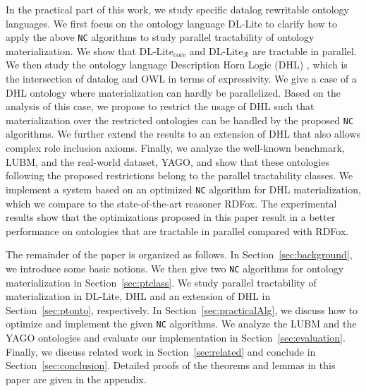In the practical part of this work, we study specific datalog rewritable ontology languages.
We first focus on the ontology language DL-Lite \cite{CalvaneseGLLR07} to clarify how to apply the above \texttt{NC} algorithms
to study parallel tractability of ontology materialization.
We show that DL-Lite$_{\text{core}}$ and DL-Lite$_\mathcal{R}$ are tractable in parallel.
We then study the ontology language Description Horn Logic (DHL) \cite{GrosofHVD03}, which is the intersection of datalog and OWL
in terms of expressivity. We give a case of a DHL ontology where materialization can hardly be parallelized.
Based on the analysis of this case, we propose to restrict the usage of DHL such that materialization over the
restricted ontologies can be handled by the proposed \texttt{NC} algorithms.
We further extend the results to an extension of DHL that also allows complex role inclusion axioms.
Finally, we analyze the well-known benchmark, LUBM, and the real-world dataset, YAGO, and
show that these ontologies following the
proposed restrictions belong to the parallel tractability classes.
We implement a system based on an optimized \texttt{NC} algorithm for DHL materialization,
which we compare to the state-of-the-art reasoner RDFox.
The experimental results show that the optimizations proposed in this paper result in a
better performance on ontologies that are
tractable in parallel compared with RDFox.

The remainder of the paper is organized as follows. In Section~\ref{sec:background}, we introduce some basic notions.
We then give two \texttt{NC} algorithms for ontology materialization in Section~\ref{sec:ptclass}.
We study parallel tractability of materialization in DL-Lite, DHL and an extension of DHL in Section~\ref{sec:ptonto}, respectively.
In Section~\ref{sec:practicalAlg},
we discuss how to optimize and implement the given \texttt{NC} algorithms.
We analyze the LUBM and the YAGO ontologies and evaluate our implementation in Section~\ref{sec:evaluation}.
Finally, we discuss related work in Section~\ref{sec:related} and conclude in Section~\ref{sec:conclusion}. Detailed proofs of the theorems and lemmas in this paper are given in the appendix.



